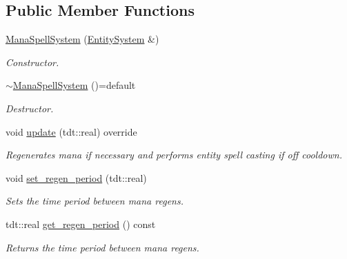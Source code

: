 \subsection*{Public Member Functions}
\begin{DoxyCompactItemize}
\item 
\hyperlink{class_mana_spell_system_a3ea9f85c878712cb8c41b0b26390f8f8}{Mana\+Spell\+System} (\hyperlink{class_entity_system}{Entity\+System} \&)
\begin{DoxyCompactList}\small\item\em Constructor. \end{DoxyCompactList}\item 
\hyperlink{class_mana_spell_system_acaca2ea30a3317e34cc6f8c28475a423}{$\sim$\+Mana\+Spell\+System} ()=default
\begin{DoxyCompactList}\small\item\em Destructor. \end{DoxyCompactList}\item 
void \hyperlink{class_mana_spell_system_a72ff0244c7ed729843fc82dde04b3477}{update} (tdt\+::real) override
\begin{DoxyCompactList}\small\item\em Regenerates mana if necessary and performs entity spell casting if off cooldown. \end{DoxyCompactList}\item 
void \hyperlink{class_mana_spell_system_a3fae933e8c9f595f03759654675b96e5}{set\+\_\+regen\+\_\+period} (tdt\+::real)
\begin{DoxyCompactList}\small\item\em Sets the time period between mana regens. \end{DoxyCompactList}\item 
tdt\+::real \hyperlink{class_mana_spell_system_a76f518959b92b7433d8af963d0a28fdd}{get\+\_\+regen\+\_\+period} () const 
\begin{DoxyCompactList}\small\item\em Returns the time period between mana regens. \end{DoxyCompactList}\end{DoxyCompactItemize}
